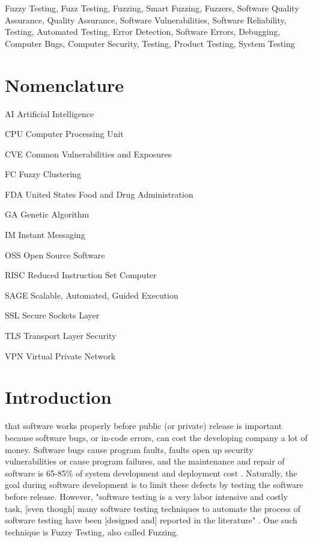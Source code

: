 \documentclass[10pt, final, journal, letterpaper, twoside, twocolumn]{IEEEtran}
\begin{document}
\begin{IEEEkeywords}
	Fuzzy Testing, Fuzz Testing, Fuzzing, Smart Fuzzing, Fuzzers, Software Quality Assurance, Quality Assurance, Software Vulnerabilities, Software Reliability, Testing, Automated Testing, Error Detection, Software Errors, Debugging, Computer Bugs, Computer Security, Testing, Product Testing, System Testing
\end{IEEEkeywords}

\section*{Nomenclature}
\begin{IEEEdescription}
\item[AI] Artificial Intelligence
\item[CPU] Computer Processing Unit
\item[CVE] Common Vulnerabilities and Exposures
\item[FC] Fuzzy Clustering
\item[FDA] United States Food and Drug Administration
\item[GA] Genetic Algorithm
\item[IM] Instant Messaging
\item[OSS] Open Source Software
\item[RISC] Reduced Instruction Set Computer
\item[SAGE] Scalable, Automated, Guided Execution
\item[SSL] Secure Sockets Layer
\item[TLS] Transport Layer Security
\item[VPN] Virtual Private Network
\end{IEEEdescription}

\section{\label{sec:introduction}Introduction}
	 that software works properly before public (or private) release is important because software bugs, or in-code errors, can cost the developing company a lot of money. Software bugs cause program faults, faults open up security vulnerabilities or cause program failures, and the maintenance and repair of software is 65-85\% of system development and deployment cost \cite{slide-defect}. Naturally, the goal during software development is to limit these defects by testing the software before release. However, "software testing is a very labor intensive and costly task, [even though] many software testing techniques to automate the process of software testing have been [designed and] reported in the literature" \cite{fuzzy-logic}. One such technique is Fuzzy Testing, also called Fuzzing.
	
\end{document}
